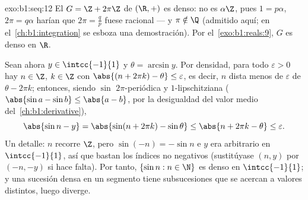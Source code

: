 \begin{solution}{exo:b1:seq:12}
El  $G = \Z + 2\pi\Z$ de $(\R, +)$ es denso: no es
$\alpha\Z$, pues $1 = p\alpha$, $2\pi = q\alpha$ harían que
$2\pi = \frac qp$ fuese racional --- y $\pi \notin \Q$ (admitido aquí;
en el~\cref{ch:b1:integration} se esboza una demostración). Por
el~\cref{exo:b1:reals:9}, $G$ es denso en $\R$.

Sean ahora $y \in \intcc{-1}{1}$ y $\theta = \arcsin y$. Por
densidad, para todo $\varepsilon > 0$ hay $n \in \Z$, $k \in \Z$ con
$\abs{(n + 2\pi k) - \theta} \leq \varepsilon$, es decir, $n$ dista
menos de $\varepsilon$ de $\theta - 2\pi k$; entonces, siendo $\sin$
$2\pi$-periódica y $1$-lipschitziana ($\abs{\sin a - \sin b} \leq
\abs{a - b}$, por la desigualdad del valor medio
del~\cref{ch:b1:derivative}),
\[
\abs{\sin n - y} = \abs{\sin(n + 2\pi k) - \sin\theta}
\leq \abs{n + 2\pi k - \theta} \leq \varepsilon .
\]
Un detalle: $n$ recorre $\Z$, pero $\sin(-n) = -\sin n$ e $y$ era
arbitrario en $\intcc{-1}{1}$, así que bastan los índices no negativos
(sustitúyase $(n, y)$ por $(-n, -y)$ si hace falta). Por tanto,
$\{\sin n : n \in \N\}$ es denso en $\intcc{-1}{1}$; y una sucesión
densa en un segmento tiene subsucesiones que se acercan a valores
distintos, luego diverge.
\end{solution}

